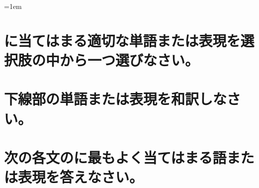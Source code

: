 \documentclass[a4paper]{ltjsarticle}
\begin{document}
\leftskip=1em

\section{\blank に当てはまる適切な単語または表現を選択肢の中から一つ選びなさい。}

\section{下線部の単語または表現を和訳しなさい。}
% 
% 
% 
% 
% 
% 
% 
% 
% 
% 
% 
% 
% 
% 
% 
% 
% 
% 
% 
% 

\section{次の各文の\blank に最もよく当てはまる語または表現を答えなさい。}
% 
% 
% 
% 
% 
%
\addtocounter{correct}{-1}
\end{document}
